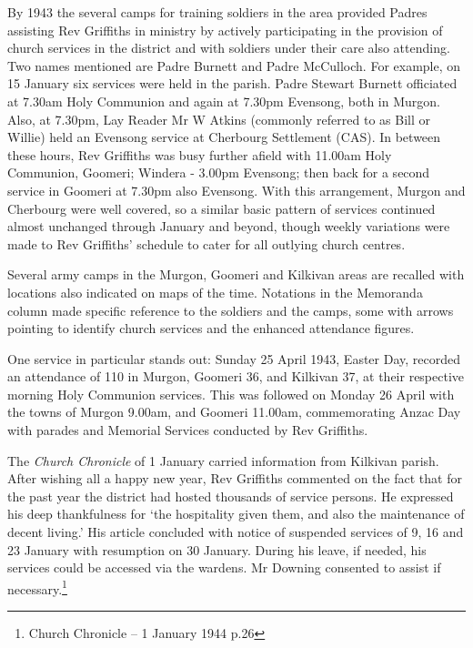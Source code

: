 By 1943 the several camps for training soldiers in the area provided
Padres assisting Rev Griffiths in ministry by actively participating in
the provision of church services in the district and with soldiers under
their care also attending. Two names mentioned are Padre Burnett and
Padre McCulloch. For example, on 15 January six services were held in
the parish. Padre Stewart Burnett officiated at 7.30am Holy Communion
and again at 7.30pm Evensong, both in Murgon. Also, at 7.30pm, Lay
Reader Mr W Atkins (commonly referred to as Bill or Willie) held an
Evensong service at Cherbourg Settlement (CAS). In between these hours,
Rev Griffiths was busy further afield with 11.00am Holy Communion,
Goomeri; Windera - 3.00pm Evensong; then back for a second service in
Goomeri at 7.30pm also Evensong. With this arrangement, Murgon and
Cherbourg were well covered, so a similar basic pattern of services
continued almost unchanged through January and beyond, though weekly
variations were made to Rev Griffiths' schedule to cater for all
outlying church centres.

Several army camps in the Murgon, Goomeri and Kilkivan areas are
recalled with locations also indicated on maps of the time. Notations in
the Memoranda column made specific reference to the soldiers and the
camps, some with arrows pointing to identify church services and the
enhanced attendance figures.

One service in particular stands out: Sunday 25 April 1943, Easter Day,
recorded an attendance of 110 in Murgon, Goomeri 36, and Kilkivan 37, at
their respective morning Holy Communion services. This was followed on
Monday 26 April with the towns of Murgon 9.00am, and Goomeri 11.00am,
commemorating Anzac Day with parades and Memorial Services conducted by
Rev Griffiths.

The \emph{Church Chronicle} of 1 January carried information from
Kilkivan parish. After wishing all a happy new year, Rev Griffiths
commented on the fact that for the past year the district had hosted
thousands of service persons. He expressed his deep thankfulness for
`the hospitality given them, and also the maintenance of decent living.'
His article concluded with notice of suspended services of 9, 16 and 23
January with resumption on 30 January. During his leave, if needed, his
services could be accessed via the wardens. Mr Downing consented to
assist if necessary.\footnote{Church Chronicle -- 1 January 1944 p.26}

